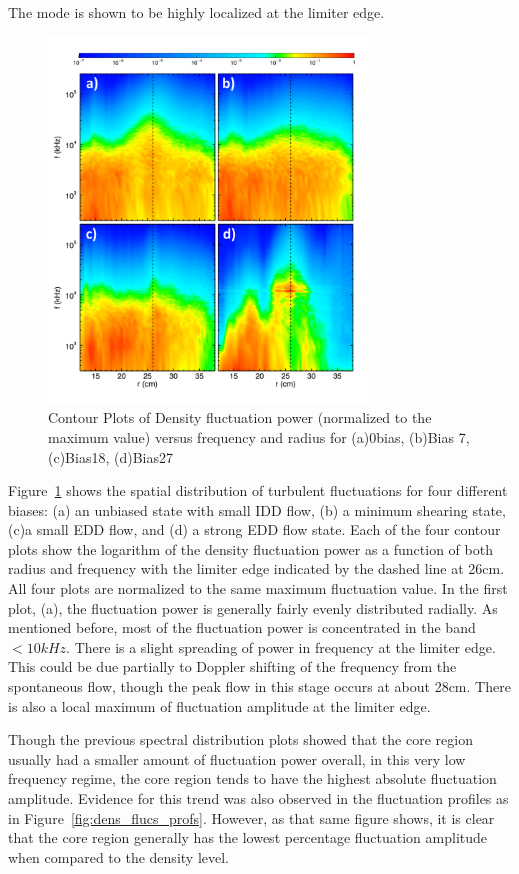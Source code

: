 \documentclass[aip,pop,amsmath,amssymb,reprint,superscriptaddress]{revtex4-1} %
\begin{document}
The mode is shown to be highly localized at the limiter edge.

\begin{figure}[!htbp]
\centerline{
\includegraphics[width=8.5cm]{dens_spec_contours_4bias_lab}}%
\caption{\label{fig:dens_spec_contours_4bias} Contour Plots of Density fluctuation power (normalized to the maximum value) versus frequency and radius for (a)0bias, (b)Bias 7, (c)Bias18, (d)Bias27}
\end{figure}

Figure~\ref{fig:dens_spec_contours_4bias} shows the spatial distribution of turbulent fluctuations for four different biases: (a) an unbiased state with small IDD flow, (b) a minimum shearing state, (c)a small EDD flow, and (d) a strong EDD flow state. Each of the four contour plots show the logarithm of the density fluctuation power as a function of both radius and frequency with the limiter edge indicated by the dashed line at 26cm. All four plots are normalized to the same maximum fluctuation value. In the first plot, (a), the fluctuation power is generally fairly evenly distributed radially. As mentioned before, most of the fluctuation power is concentrated in the band $<10kHz$. There is a slight spreading of power in frequency at the limiter edge. This could be due partially to Doppler shifting of the frequency from the spontaneous flow, though the peak flow in this stage occurs at about 28cm. There is also a local maximum of fluctuation amplitude at the limiter edge. 

Though the previous spectral distribution plots showed that the core region usually had a smaller amount of fluctuation power overall, in this very low frequency regime, the core region tends to have the highest absolute fluctuation amplitude. Evidence for this trend was also observed in the fluctuation profiles as in Figure~\ref{fig:dens_flucs_profs}. However, as that same figure shows, it is clear that the core region generally has the lowest percentage fluctuation amplitude when compared to the density level. 
\end{document}
